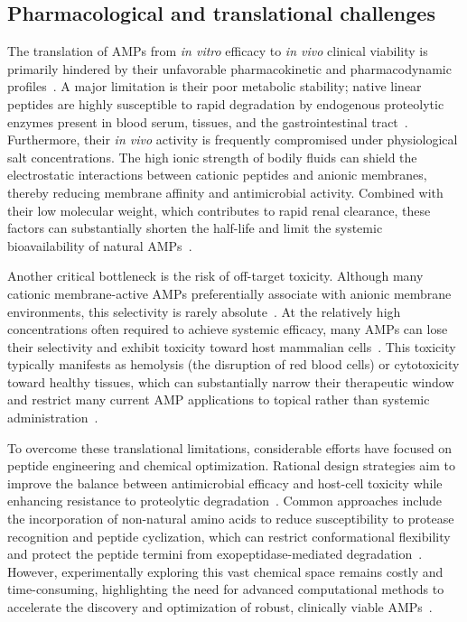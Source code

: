 \subsection{Pharmacological and translational challenges}

The translation of AMPs from \textit{in vitro} efficacy to \textit{in vivo} clinical viability is primarily hindered by their unfavorable pharmacokinetic and pharmacodynamic profiles~\cite{fracaso_amps}. A major limitation is their poor metabolic stability; native linear peptides are highly susceptible to rapid degradation by endogenous proteolytic enzymes present in blood serum, tissues, and the gastrointestinal tract~\cite{Dijksteel2021,degradacion_1,degradacion_2}. Furthermore, their \textit{in vivo} activity is frequently compromised under physiological salt concentrations. The high ionic strength of bodily fluids can shield the electrostatic interactions between cationic peptides and anionic membranes, thereby reducing membrane affinity and antimicrobial activity. Combined with their low molecular weight, which contributes to rapid renal clearance, these factors can substantially shorten the half-life and limit the systemic bioavailability of natural AMPs~\cite{fracaso_amps}.

Another critical bottleneck is the risk of off-target toxicity. Although many cationic membrane-active AMPs preferentially associate with anionic membrane environments, this selectivity is rarely absolute~\cite{magana2020value}. At the relatively high concentrations often required to achieve systemic efficacy, many AMPs can lose their selectivity and exhibit toxicity toward host mammalian cells~\cite{Lyu2023}. This toxicity typically manifests as hemolysis (the disruption of red blood cells) or cytotoxicity toward healthy tissues, which can substantially narrow their therapeutic window and restrict many current AMP applications to topical rather than systemic administration~\cite{haney2019reassessing}.

To overcome these translational limitations, considerable efforts have focused on peptide engineering and chemical optimization. Rational design strategies aim to improve the balance between antimicrobial efficacy and host-cell toxicity while enhancing resistance to proteolytic degradation~\cite{Muttenthaler2021}. Common approaches include the incorporation of non-natural amino acids to reduce susceptibility to protease recognition and peptide cyclization, which can restrict conformational flexibility and protect the peptide termini from exopeptidase-mediated degradation~\cite{Carmona2013,Lucana2021}. However, experimentally exploring this vast chemical space remains costly and time-consuming, highlighting the need for advanced computational methods to accelerate the discovery and optimization of robust, clinically viable AMPs~\cite{SUN2026102685,robert2021resource}.

